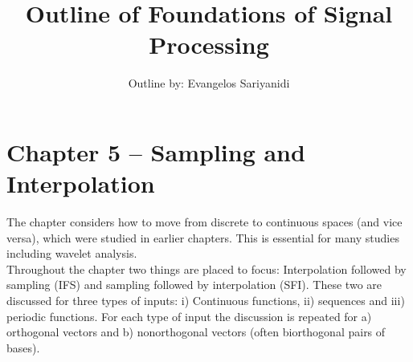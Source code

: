 \documentclass{article}
\begin{document}
\author{Outline by: Evangelos Sariyanidi}

\title{\bf Outline of Foundations of Signal Processing}
\maketitle
\section*{Chapter 5 -- Sampling and Interpolation}

The chapter considers how to move from discrete to continuous spaces (and vice versa), which were studied in earlier chapters. This is essential for many studies including wavelet analysis.\\

Throughout the chapter two things are placed to focus: Interpolation followed by sampling (IFS) and sampling followed by interpolation (SFI). These two are discussed for three types of inputs: i) Continuous functions, ii) sequences and iii) periodic functions. For each type of input the discussion is repeated for a) orthogonal vectors and b) nonorthogonal vectors (often biorthogonal pairs of bases).
\end{document}
